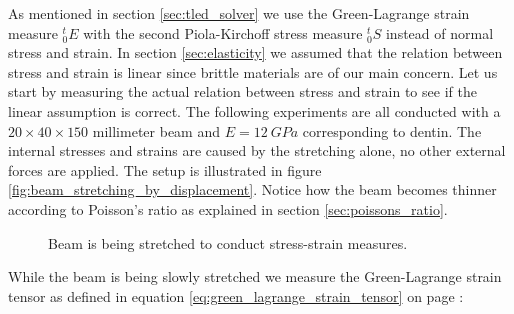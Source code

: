 As mentioned in section \vref{sec:tled_solver} we use the
Green-Lagrange strain measure $^t_0E$ 
with the second Piola-Kirchoff stress measure $^t_0S$ instead of
normal stress and strain. In section \vref{sec:elasticity} we assumed
that the relation between stress and strain is linear since brittle
materials are of our main concern. 
Let us start by measuring the actual
relation between stress and strain to see if the linear assumption is
correct. The following experiments are all conducted with a $20 \times
40 \times 150$ millimeter beam and $E = 12 \ GPa$ corresponding to
dentin. The internal stresses and strains are caused by 
the stretching alone, no other external forces are applied.
The setup is illustrated in figure
\vref{fig:beam_stretching_by_displacement}. Notice how the beam becomes
thinner according to Poisson's ratio as explained in section
\vref{sec:poissons_ratio}.

\begin{figure}
  \begin{minipage}[b]{0.5\linewidth}
    \centering
  \end{minipage}
  \begin{minipage}[b]{0.5\linewidth}
    \centering
  \end{minipage}
\caption{Beam is being stretched to conduct stress-strain measures.}
\label{fig:beam_stretching_by_displacement}
\end{figure}
  
While the beam is being slowly stretched we measure the Green-Lagrange
strain tensor as defined in equation
\eqref{eq:green_lagrange_strain_tensor} on page 
\pageref{eq:green_lagrange_strain_tensor}:

